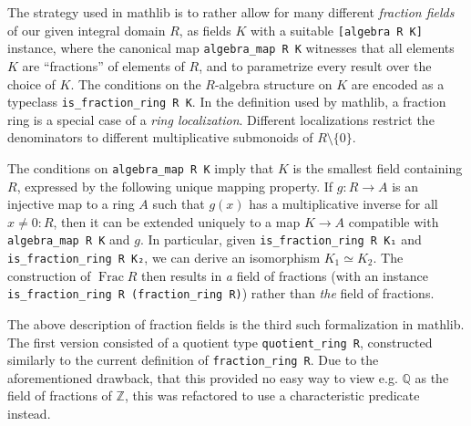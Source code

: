 \documentclass[sn-mathphys]{sn-jnl}%
\newcommand{\lean}[1]{\texttt{#1}\xspace}
\newcommand{\mathlib}{\textsf{mathlib}\xspace}
\newcommand{\QQ}{\mathbb{Q}}
\renewcommand{\Z}{\mathbb{Z}}
\DeclareMathOperator{\Frac}{Frac}
\begin{document}
The strategy used in \mathlib is to rather allow for many different \emph{fraction fields} of our given integral domain $R$,
as fields $K$ with a suitable \lean{[algebra R K]} instance, where the canonical map \lean{algebra\_map R K} witnesses that all elements $K$ are ``fractions'' of elements of $R$,
and to parametrize every result over the choice of $K$.
The conditions on the $R$-algebra structure on $K$ are encoded as a typeclass \lean{is\_fraction\_ring R K}.
In the definition used by \mathlib, a fraction ring is a special case of a \emph{ring localization}.
Different localizations restrict the denominators to different multiplicative submonoids of $R\setminus\{0\}$.

The conditions on \lean{algebra\_map R K} imply that $K$ is the smallest field containing $R$, expressed by the following unique mapping property.
If $g \colon R \to A$ is an injective map to a ring $A$ such that $g(x)$ has a multiplicative inverse for all $x \ne 0 : R$, then
it can be extended uniquely to a map $K \to A$ compatible with \lean{algebra\_map R K} and $g$.
In particular, given \lean{is\_fraction\_ring R K₁} and \lean{is\_fraction\_ring R K₂}, we can derive an isomorphism $K_1 \simeq K_2$.
The construction of $\Frac R$ then results in \emph{a} field of fractions (with an instance \lean{is\_fraction\_ring R (fraction\_ring R)}) rather than \emph{the} field of fractions.

The above description of fraction fields is the third such formalization in \mathlib. The first version
consisted of a quotient type \lean{quotient\_ring R},
constructed similarly to the current definition of \lean{fraction\_ring R}.
Due to the aforementioned drawback,
that this provided no easy way to view e.g. $\QQ$ as the field of fractions of $\Z$,
this was refactored to use a characteristic predicate instead.
\end{document}
